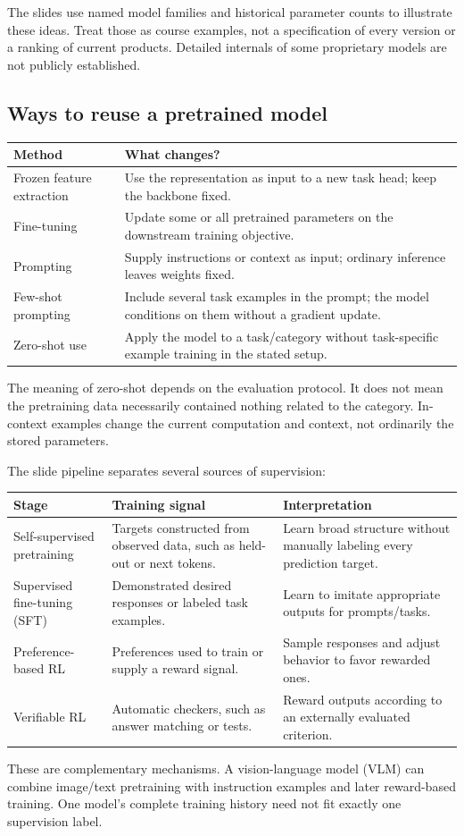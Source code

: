 \documentclass[11pt]{article}
\begin{document}
The slides use named model families and historical parameter counts to illustrate these ideas. Treat those as course examples, not a specification of every version or a ranking of current products. Detailed internals of some proprietary models are not publicly established.

\subsection{Ways to reuse a pretrained model}
\begin{longtable}{@{}P{.25\textwidth}P{.65\textwidth}@{}}
\toprule Method & What changes?\\\midrule\endhead
Frozen feature extraction & Use the representation as input to a new task head; keep the backbone fixed.\\
Fine-tuning & Update some or all pretrained parameters on the downstream training objective.\\
Prompting & Supply instructions or context as input; ordinary inference leaves weights fixed.\\
Few-shot prompting & Include several task examples in the prompt; the model conditions on them without a gradient update.\\
Zero-shot use & Apply the model to a task/category without task-specific example training in the stated setup.\\\bottomrule
\end{longtable}
The meaning of zero-shot depends on the evaluation protocol. It does not mean the pretraining data necessarily contained nothing related to the category. In-context examples change the current computation and context, not ordinarily the stored parameters.

The slide pipeline separates several sources of supervision:
\begin{longtable}{@{}P{.21\textwidth}P{.31\textwidth}P{.38\textwidth}@{}}
\toprule Stage & Training signal & Interpretation\\\midrule\endhead
Self-supervised pretraining & Targets constructed from observed data, such as held-out or next tokens. & Learn broad structure without manually labeling every prediction target.\\
Supervised fine-tuning (SFT) & Demonstrated desired responses or labeled task examples. & Learn to imitate appropriate outputs for prompts/tasks.\\
Preference-based RL & Preferences used to train or supply a reward signal. & Sample responses and adjust behavior to favor rewarded ones.\\
Verifiable RL & Automatic checkers, such as answer matching or tests. & Reward outputs according to an externally evaluated criterion.\\\bottomrule
\end{longtable}
These are complementary mechanisms. A vision-language model (VLM) can combine image/text pretraining with instruction examples and later reward-based training. One model's complete training history need not fit exactly one supervision label.
\end{document}
